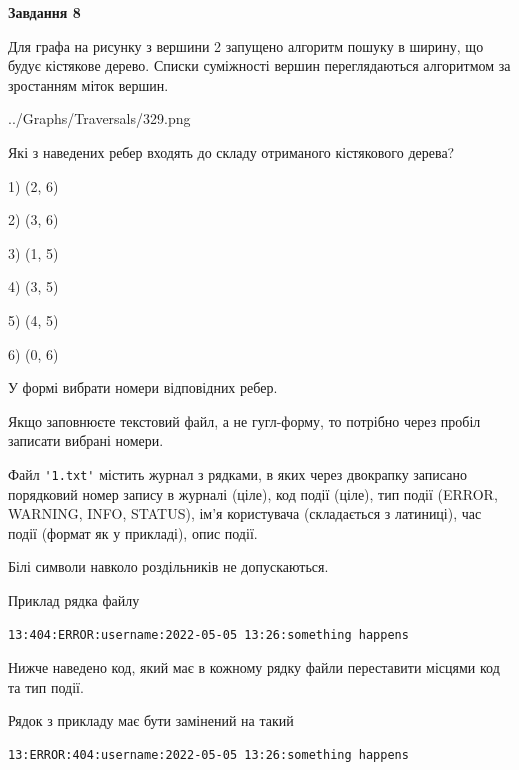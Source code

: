 \documentclass[12pt, ukrainian]{article}
\def\code#1{\Verb!#1!}
\begin{document}
{\begin {large}
{\begin {center}\textbf{Завдання 8}\end {center}}\par
Для графа на рисунку з вершини 2 запущено алгоритм пошуку в ширину, що будує кістякове дерево. Списки суміжності вершин переглядаються алгоритмом за зростанням міток вершин.\par
\begin{center}
	{../Graphs/Traversals/329.png}
\end{center}
\par Які з наведених ребер входять до складу отриманого кістякового дерева?\par
1) (2, 6)\par
2) (3, 6)\par
3) (1, 5)\par
4) (3, 5)\par
5) (4, 5)\par
6) (0, 6)\par
{\vskip 15pt} У формі вибрати номери відповідних ребер.


Якщо заповнюєте текстовий файл, а не гугл-форму, то потрібно через пробіл записа\-ти вибрані номери.\par
\newpage


Файл \code{'1.txt'} містить журнал з рядками, в яких через двокрапку записано поряд\-ко\-вий номер запису в журналі (ціле), код події (ціле), тип події (ERROR,\\ WARNING, INFO, STATUS), ім'я користувача (складається з латиниці), час події (фор\-мат як у прикладі), опис події.

Білі символи навколо роздільників не допускаються.

Приклад рядка файлу



\begin{verbatim}
13:404:ERROR:username:2022-05-05 13:26:something happens
\end{verbatim}


Нижче наведено код, який має в кожному рядку файли переставити місцями код та тип події.

Рядок з прикладу має бути замінений на такий



\begin{verbatim}
13:ERROR:404:username:2022-05-05 13:26:something happens
\end{verbatim}





\end{large}}
\end{document}
